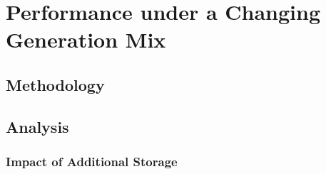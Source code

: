 \chapter{ Performance under a Changing Generation Mix}
\section{ Methodology }
\section{ Analysis }
\subsection{ Impact of Additional Storage }

